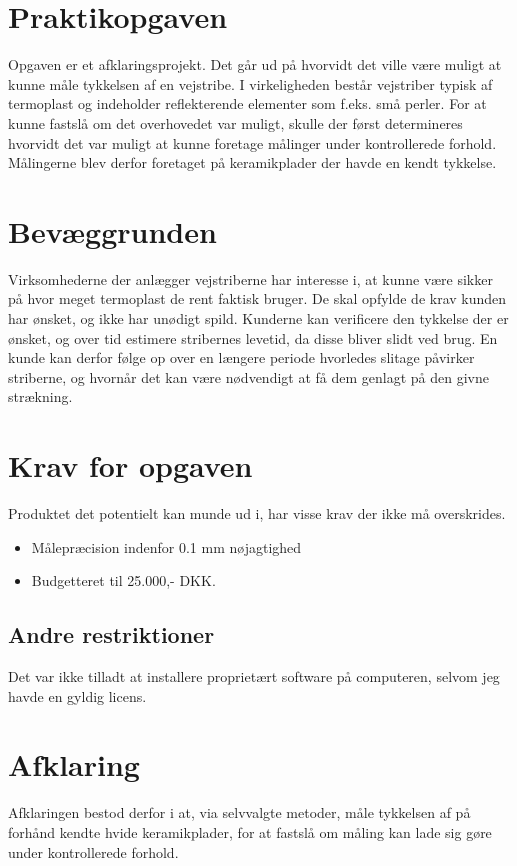 \section{Praktikopgaven}
Opgaven er et afklaringsprojekt. Det går ud på hvorvidt det ville være muligt at kunne måle tykkelsen af en vejstribe. I virkeligheden består vejstriber typisk af termoplast og indeholder reflekterende elementer som f.eks. små perler. For at kunne fastslå om det overhovedet var muligt, skulle der først determineres hvorvidt det var muligt at kunne foretage målinger under kontrollerede forhold. Målingerne blev derfor foretaget på keramikplader der havde en kendt tykkelse.

\section{Bevæggrunden}
Virksomhederne der anlægger vejstriberne har interesse i, at kunne være sikker på hvor meget termoplast de rent faktisk bruger. De skal opfylde de krav kunden har ønsket, og ikke har unødigt spild. Kunderne kan verificere den tykkelse der er ønsket, og over tid estimere stribernes levetid, da disse bliver slidt ved brug. En kunde kan derfor følge op over en længere periode hvorledes slitage påvirker striberne, og hvornår det kan være nødvendigt at få dem genlagt på den givne strækning.

\section{Krav for opgaven}
Produktet det potentielt kan munde ud i, har visse krav der ikke må overskrides.

\begin{itemize}
	\item Målepræcision indenfor 0.1 mm nøjagtighed
	\item Budgetteret til 25.000,- DKK.
\end{itemize}

\subsection{Andre restriktioner}
Det var ikke tilladt at installere proprietært software på computeren, selvom jeg havde en gyldig licens.

\section{Afklaring}
Afklaringen bestod derfor i at, via selvvalgte metoder, måle tykkelsen af på forhånd kendte hvide keramikplader, for at fastslå om måling kan lade sig gøre under kontrollerede forhold.

